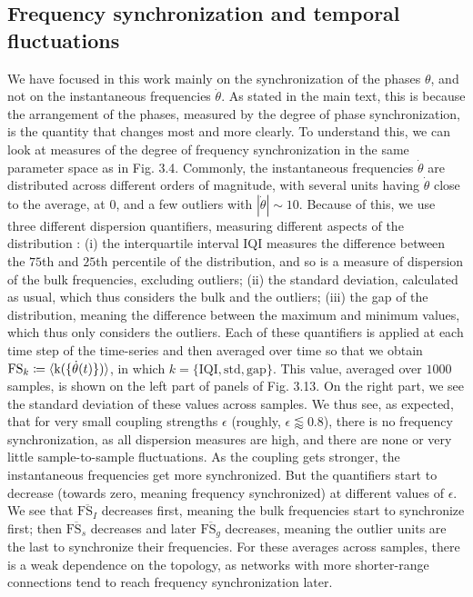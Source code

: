 \subsection*{Frequency synchronization and temporal fluctuations}
We have focused in this work mainly on the synchronization of the phases $\theta$, and not on the instantaneous frequencies $\dot{\theta}$. As stated in the main text, this is because the arrangement of the phases, measured by the degree of phase synchronization, is the quantity that changes most and more clearly. To understand this, we can look at measures of the degree of frequency synchronization in the same parameter space as in Fig. 3.4. Commonly, the instantaneous frequencies $\dot{\theta}$ are distributed across different orders of magnitude, with several units having $\dot{\theta}$ close to the average, at $0$, and a few outliers with $|\dot{\theta}| \sim 10$. Because of this, we use three different dispersion quantifiers, measuring different aspects of the distribution : (i) the interquartile interval IQI measures the difference between the $75$th and $25$th percentile of the distribution, and so is a measure of dispersion of the bulk frequencies, excluding outliers; (ii) the standard deviation, calculated as usual, which thus considers the bulk and the outliers; (iii) the gap of the distribution, meaning the difference between the maximum and minimum values, which thus only considers the outliers. Each of these quantifiers is applied at each time step of the time-series and then averaged over time so that we obtain $\mathrm{FS}_k \coloneqq \langle \mathrm{k}( \{\dot{\theta}(t)\}) \rangle$, in which $k = \{\mathrm{IQI}, \mathrm{std}, \mathrm{gap}\}$. This value, averaged over $1000$ samples, is shown on the left part of panels of Fig. 3.13. On the right part, we see the standard deviation of these values across samples. We thus see, as expected, that for very small coupling strengths $\epsilon$ (roughly, $\epsilon \lessapprox 0.8$), there is no frequency synchronization, as all dispersion measures are high, and there are none or very little sample-to-sample fluctuations. As the coupling gets stronger, the instantaneous frequencies get more synchronized. But the quantifiers start to decrease (towards zero, meaning frequency synchronized) at different values of $\epsilon$. We see that $\overline{\mathrm{FS}_I}$ decreases first, meaning the bulk frequencies start to synchronize first; then $\overline{\mathrm{FS}_s}$ decreases and later $\overline{\mathrm{FS}_g}$ decreases, meaning the outlier units are the last to synchronize their frequencies. For these averages across samples, there is a weak dependence on the topology, as networks with more shorter-range connections tend to reach frequency synchronization later. 

